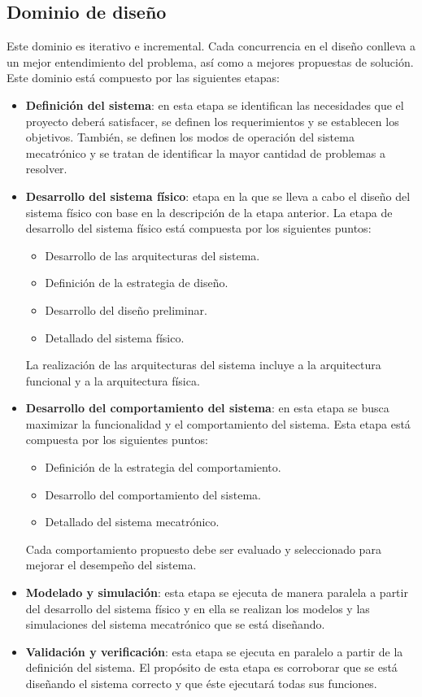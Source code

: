 		\subsection*{Dominio de dise\~{n}o}
\noindent Este dominio es iterativo e incremental. Cada concurrencia en el dise\~{n}o conlleva a un mejor entendimiento del problema, as\'i como a mejores propuestas de soluci\'on. Este dominio est\'a compuesto por las siguientes etapas:

\begin{itemize}
	\item \textbf{Definici\'on del sistema}: en esta etapa se identifican las necesidades que el proyecto deber\'a satisfacer, se definen los requerimientos y se establecen los objetivos. Tambi\'en, se definen los modos de operaci\'on del sistema mecatr\'onico y se tratan de identificar la mayor cantidad de problemas a resolver.
	\item \textbf{Desarrollo del sistema f\'isico}: etapa en la que se lleva a cabo el dise\~{n}o del sistema f\'isico con base en la descripci\'on de la etapa anterior. La etapa de desarrollo del sistema f\'isico est\'a compuesta por los siguientes puntos:
		\begin{itemize}
			\item Desarrollo de las arquitecturas del sistema.
			\item Definici\'on de la estrategia de dise\~{n}o.
			\item Desarrollo del dise\~{n}o preliminar.
			\item Detallado del sistema f\'isico.
\end{itemize}
		
La realizaci\'on de las arquitecturas del sistema incluye a la arquitectura funcional y a la arquitectura f\'isica.
	\item \textbf{Desarrollo del comportamiento del sistema}: en esta etapa se busca maximizar la funcionalidad y el comportamiento del sistema. Esta etapa est\'a compuesta por los siguientes puntos:
		\begin{itemize}
			\item Definici\'on de la estrategia del comportamiento.
			\item Desarrollo del comportamiento del sistema.
			\item Detallado del sistema mecatr\'onico.
		\end{itemize}
Cada comportamiento propuesto debe ser evaluado y seleccionado para mejorar el desempe\~{n}o del sistema.		
	\item \textbf{Modelado y simulaci\'on}: esta etapa se ejecuta de manera paralela a partir del desarrollo del sistema f\'isico y en ella se realizan los modelos y las simulaciones del sistema mecatr\'onico que se est\'a dise\~{n}ando.
	\item \textbf{Validaci\'on y verificaci\'on}: esta etapa se ejecuta en paralelo a partir de la definici\'on del sistema. El prop\'osito de esta etapa es corroborar que se est\'a dise\~{n}ando el sistema correcto y que \'este ejecutar\'a todas sus funciones.
\end{itemize}

